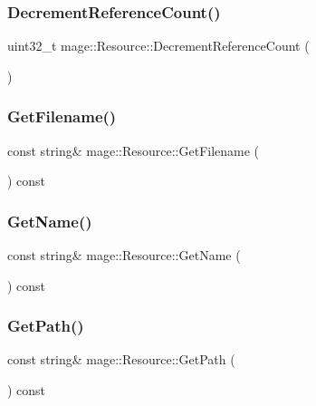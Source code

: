 \subsubsection{\texorpdfstring{Decrement\+Reference\+Count()}{DecrementReferenceCount()}}
{\footnotesize\ttfamily uint32\+\_\+t mage\+::\+Resource\+::\+Decrement\+Reference\+Count (\begin{DoxyParamCaption}{ }\end{DoxyParamCaption})\hspace{0.3cm}{\ttfamily [private]}}

\hypertarget{classmage_1_1_resource_a1e5163aed4ec9f73c477df2fe7ca2c03}{}\label{classmage_1_1_resource_a1e5163aed4ec9f73c477df2fe7ca2c03} 
\subsubsection{\texorpdfstring{Get\+Filename()}{GetFilename()}}
{\footnotesize\ttfamily const string\& mage\+::\+Resource\+::\+Get\+Filename (\begin{DoxyParamCaption}{ }\end{DoxyParamCaption}) const}

\hypertarget{classmage_1_1_resource_a77713b0c74f8983afc2d42843afe8cbe}{}\label{classmage_1_1_resource_a77713b0c74f8983afc2d42843afe8cbe} 
\subsubsection{\texorpdfstring{Get\+Name()}{GetName()}}
{\footnotesize\ttfamily const string\& mage\+::\+Resource\+::\+Get\+Name (\begin{DoxyParamCaption}{ }\end{DoxyParamCaption}) const}

\hypertarget{classmage_1_1_resource_a2ef6c6937947b56cbabc569e3a63ca71}{}\label{classmage_1_1_resource_a2ef6c6937947b56cbabc569e3a63ca71} 
\subsubsection{\texorpdfstring{Get\+Path()}{GetPath()}}
{\footnotesize\ttfamily const string\& mage\+::\+Resource\+::\+Get\+Path (\begin{DoxyParamCaption}{ }\end{DoxyParamCaption}) const}


